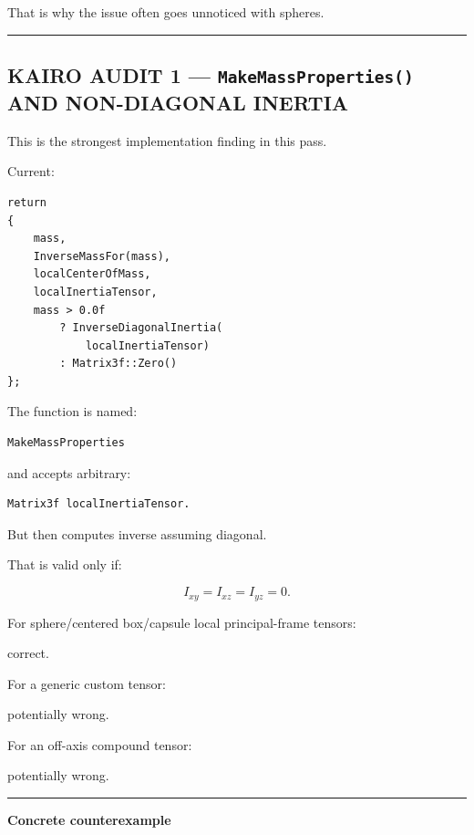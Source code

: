 That is why the issue often goes unnoticed with spheres.

\begin{center}\rule{0.5\linewidth}{0.5pt}\end{center}

\subsection{\texorpdfstring{KAIRO AUDIT 1 --- \texttt{MakeMassProperties()} AND NON-DIAGONAL INERTIA}{KAIRO AUDIT 1 --- MakeMassProperties() AND NON-DIAGONAL INERTIA}}\label{06-engine-ii-ch035-kairo-audit-1-makemassproperties-and-non-diagonal-inertia}

This is the strongest implementation finding in this pass.

Current:

\begin{verbatim}
return
{
    mass,
    InverseMassFor(mass),
    localCenterOfMass,
    localInertiaTensor,
    mass > 0.0f
        ? InverseDiagonalInertia(
            localInertiaTensor)
        : Matrix3f::Zero()
};
\end{verbatim}

The function is named:

\begin{verbatim}
MakeMassProperties
\end{verbatim}

and accepts arbitrary:

\begin{verbatim}
Matrix3f localInertiaTensor.
\end{verbatim}

But then computes inverse assuming diagonal.

That is valid only if:

\[
I_{xy}=I_{xz}=I_{yz}=0.
\]

For sphere/centered box/capsule local principal-frame tensors:

correct.

For a generic custom tensor:

potentially wrong.

For an off-axis compound tensor:

potentially wrong.

\begin{center}\rule{0.5\linewidth}{0.5pt}\end{center}

\textbf{Concrete counterexample}

